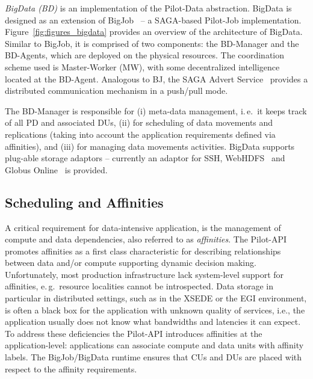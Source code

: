\documentclass{acm_proc_article-sp}
\newcommand{\jhanote}[1]{ {\textcolor{red} { ***SJ: #1 }}}
\newcommand{\alnote}[1]{ {\textcolor{blue} { ***andreL: #1 }}}
\newcommand{\alnote}[1]{}
\newcommand{\jhanote}[1]{}
\newcommand{\upp}{\vspace*{-0.5em}}
\newcommand{\dus}{DUs\xspace}
\newcommand{\pd}{PD\xspace}
\begin{document}
{\it BigData (BD)} is an implementation of the Pilot-Data
abstraction. BigData is designed as an extension of 
BigJob~\cite{bigjob_web} -- a SAGA-based Pilot-Job implementation.
Figure~\ref{fig:figures_bigdata} provides an overview of the
architecture of BigData. Similar to BigJob, it is comprised of two
components: the BD-Manager and the BD-Agents, which are deployed on
the physical resources.  The coordination scheme used is Master-Worker
(MW), with some decentralized intelligence located at the BD-Agent.
Analogous to BJ, the SAGA Advert Service~\cite{saga_advert} 
provides a distributed communication mechanism in a push/pull mode.

The BD-Manager is responsible for (i) meta-data management, i.\,e.\ it
keeps track of all \pd and associated \dus, 
(ii) for scheduling of data movements and replications 
(taking into account the application requirements defined
via affinities), and (iii) for managing data movements activities. 
BigData supports plug-able storage adaptors -- currently an adaptor 
for SSH, WebHDFS~\cite{webhdfs} and Globus Online~\cite{10.1109/MIC.2011.64}
is provided. 


\upp
\subsection{Scheduling and Affinities}
\label{sec-affinities}

A critical requirement for data-intensive application, is the
management of compute and data dependencies, also referred to as {\it
  affinities}. The Pilot-API promotes affinities as a first class
characteristic for describing relationships between data and/or
compute supporting dynamic decision making.  Unfortunately, most
production infrastructure lack system-level support for affinities,
e.\,g.\ resource localities cannot be introspected. Data storage in
particular in distributed settings, such as in the XSEDE or the EGI
environment, is often a black box for the application with unknown
quality of services, i.e., the application usually does not know what
bandwidths and latencies it can expect. To address these deficiencies
the Pilot-API introduces affinities at the application-level:
applications can associate compute and data units with affinity
labels. The BigJob/BigData runtime ensures that CUs and DUs are placed
with respect to the affinity requirements.
\end{document}
